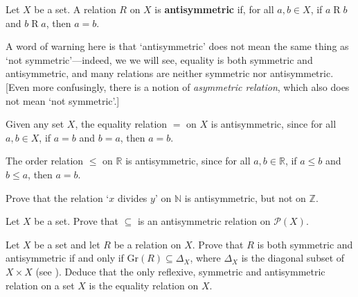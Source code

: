 \begin{definition}
Let $X$ be a set. A relation $R$ on $X$ is \textbf{antisymmetric} if, for all $a,b \in X$, if $a \mathrel{R} b$ and $b \mathrel{R} a$, then $a=b$.
\end{definition}

\begin{center}
\end{center}

A word of warning here is that `antisymmetric' does not mean the same thing as `not symmetric'---indeed, we we will see, equality is both symmetric and antisymmetric, and many relations are neither symmetric nor antisymmetric. [Even more confusingly, there is a notion of \textit{asymmetric relation}, which also does not mean `not symmetric'.]

\begin{example}
Given any set $X$, the equality relation $=$ on $X$ is antisymmetric, since for all $a,b \in X$, if $a=b$ and $b=a$, then $a=b$.
\end{example}

\begin{example}
The order relation $\le$ on $\mathbb{R}$ is antisymmetric, since for all $a,b \in \mathbb{R}$, if $a \le b$ and $b \le a$, then $a=b$.
\end{example}

\begin{exercise}
\label{exDivisibilityIsOrIsNotAntisymmetric}
Prove that the relation `$x$ divides $y$' on $\mathbb{N}$ is antisymmetric, but not on $\mathbb{Z}$.
\end{exercise}

\begin{exercise}
Let $X$ be a set. Prove that $\subseteq$ is an antisymmetric relation on $\mathcal{P}(X)$.
\end{exercise}

\begin{exercise}
Let $X$ be a set and let $R$ be a relation on $X$. Prove that $R$ is both symmetric and antisymmetric if and only if $\mathrm{Gr}(R) \subseteq \Delta_X$, where $\Delta_X$ is the diagonal subset of $X \times X$ (see ). Deduce that the only reflexive, symmetric and antisymmetric relation on a set $X$ is the equality relation on $X$.
\end{exercise}

